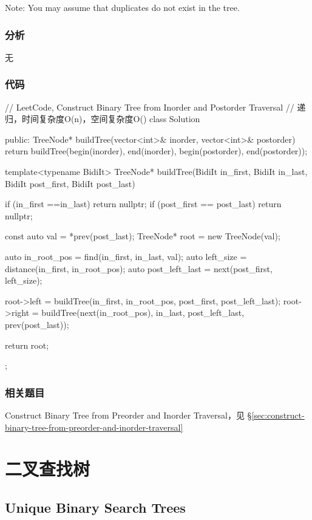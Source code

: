 Note:
You may assume that duplicates do not exist in the tree.


\subsubsection{分析}
无


\subsubsection{代码}
\begin{Code}
// LeetCode, Construct Binary Tree from Inorder and Postorder Traversal
// 递归，时间复杂度O(n)，空间复杂度O(\logn)
class Solution {
public:
    TreeNode* buildTree(vector<int>& inorder, vector<int>& postorder) {
        return buildTree(begin(inorder), end(inorder),
                begin(postorder), end(postorder));
    }

    template<typename BidiIt>
    TreeNode* buildTree(BidiIt in_first, BidiIt in_last,
            BidiIt post_first, BidiIt post_last) {
        if (in_first ==in_last) return nullptr;
        if (post_first == post_last) return nullptr;

        const auto val = *prev(post_last);
        TreeNode* root = new TreeNode(val);

        auto in_root_pos = find(in_first, in_last, val);
        auto left_size = distance(in_first, in_root_pos);
        auto post_left_last = next(post_first, left_size);

        root->left = buildTree(in_first, in_root_pos, post_first, post_left_last);
        root->right = buildTree(next(in_root_pos), in_last, post_left_last,
                prev(post_last));

        return root;
    }
};
\end{Code}


\subsubsection{相关题目}
\begindot
\item Construct Binary Tree from Preorder and Inorder Traversal，见 \S \ref{sec:construct-binary-tree-from-preorder-and-inorder-traversal}
\myenddot


\section{二叉查找树} %


\subsection{Unique Binary Search Trees}
\label{sec:unique-binary-search-trees}


